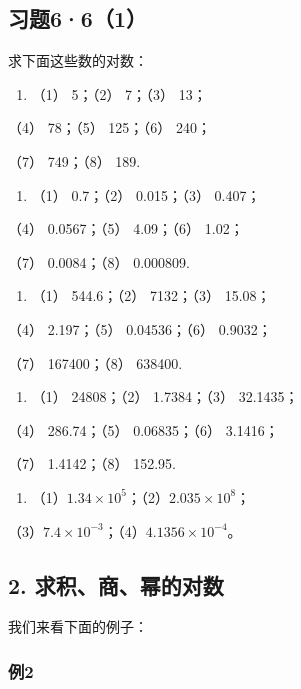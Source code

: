 \subsection{习题6·6（1）}

求下面这些数的对数：

\begin{enumerate}
\item
  （1） 5；（2） 7；（3） 13；
\end{enumerate}

（4） 78；（5） 125；（6） 240；

（7） 749；（8） 189.

\begin{enumerate}[start=2]
\item
  （1） 0.7；（2） 0.015；（3） 0.407；
\end{enumerate}

（4） 0.0567；（5） 4.09；（6） 1.02；

（7） 0.0084；（8） 0.000809.

\begin{enumerate}[start=3]
\item
  （1） 544.6；（2） 7132；（3） 15.08；
\end{enumerate}

（4） 2.197；（5） 0.04536；（6） 0.9032；

（7） 167400；（8） 638400.

\begin{enumerate}[start=4]
\item
  （1） 24808；（2） 1.7384；（3） 32.1435；
\end{enumerate}

（4） 286.74；（5） 0.06835；（6） 3.1416；

（7） 1.4142；（8） 152.95.

\begin{enumerate}[start=5]
\item
  （1）\(1.34 \times 10^{5}\)；（2）\(2.035 \times 10^{8}\)；
\end{enumerate}

（3）\(7.4 \times 10^{-3}\)；（4）\(4.1356 \times 10^{-4}\)。

\subsection{2. 求积、商、幂的对数}

我们来看下面的例子：

\subsubsection{例2}

